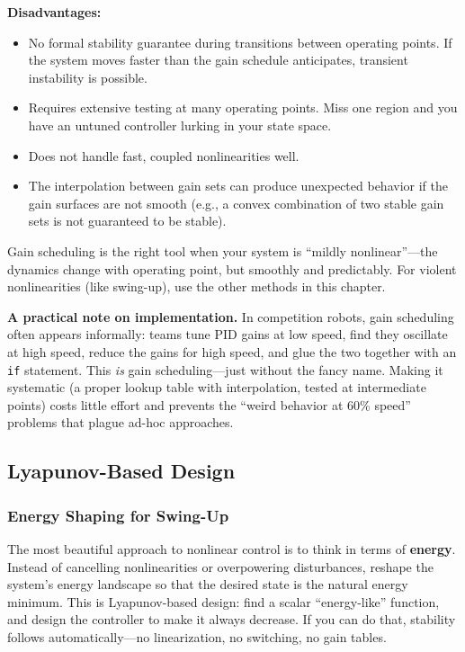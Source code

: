 \textbf{Disadvantages:}
\begin{itemize}[nosep]
    \item No formal stability guarantee during transitions between operating points. If the system moves faster than the gain schedule anticipates, transient instability is possible.
    \item Requires extensive testing at many operating points. Miss one region and you have an untuned controller lurking in your state space.
    \item Does not handle fast, coupled nonlinearities well.
    \item The interpolation between gain sets can produce unexpected behavior if the gain surfaces are not smooth (e.g., a convex combination of two stable gain sets is not guaranteed to be stable).
\end{itemize}

Gain scheduling is the right tool when your system is ``mildly nonlinear''---the dynamics change with operating point, but smoothly and predictably. For violent nonlinearities (like swing-up), use the other methods in this chapter.

\textbf{A practical note on implementation.} In competition robots, gain scheduling often appears informally: teams tune PID gains at low speed, find they oscillate at high speed, reduce the gains for high speed, and glue the two together with an \texttt{if} statement. This \textit{is} gain scheduling---just without the fancy name. Making it systematic (a proper lookup table with interpolation, tested at intermediate points) costs little effort and prevents the ``weird behavior at 60\% speed'' problems that plague ad-hoc approaches.

\subsection{Lyapunov-Based Design}

\subsubsection{Energy Shaping for Swing-Up}

The most beautiful approach to nonlinear control is to think in terms of \textbf{energy}. Instead of cancelling nonlinearities or overpowering disturbances, reshape the system's energy landscape so that the desired state is the natural energy minimum. This is Lyapunov-based design: find a scalar ``energy-like'' function, and design the controller to make it always decrease. If you can do that, stability follows automatically---no linearization, no switching, no gain tables.

